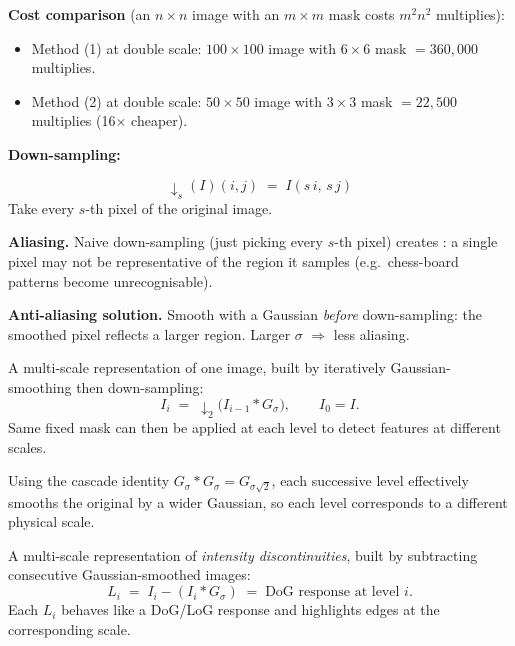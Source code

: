 \textbf{Cost comparison} (an $n \times n$ image with an $m \times m$ mask costs $m^2 n^2$ multiplies):
\begin{itemize}
  \item Method (1) at double scale: $100\times 100$ image with $6\times 6$ mask $= 360{,}000$ multiplies.
  \item Method (2) at double scale: $50\times 50$ image with $3\times 3$ mask $= 22{,}500$ multiplies (16$\times$ cheaper).
\end{itemize}

\separator

\textbf{Down-sampling:}

\begin{defbox}
\[
{\downarrow}_s(I)(i,j) \;=\; I(s\, i,\, s\, j)
\]
Take every $s$-th pixel of the original image.
\end{defbox}

\textbf{Aliasing.} Naive down-sampling (just picking every $s$-th pixel) creates : a single pixel may not be representative of the region it samples (e.g.\ chess-board patterns become unrecognisable).

\textbf{Anti-aliasing solution.} Smooth with a Gaussian \emph{before} down-sampling: the smoothed pixel reflects a larger region. Larger $\sigma$ $\Rightarrow$ less aliasing.

\separator

\begin{defbox}
A multi-scale representation of one image, built by iteratively Gaussian-smoothing then down-sampling:
\[
I_i \;=\; {\downarrow}_2 \bigl( I_{i-1} \ast G_\sigma \bigr), \qquad I_0 = I.
\]
Same fixed mask can then be applied at each level to detect features at different scales.
\end{defbox}

Using the cascade identity $G_\sigma \ast G_\sigma = G_{\sigma\sqrt{2}}$, each successive level effectively smooths the original by a wider Gaussian, so each level corresponds to a different physical scale.

\begin{defbox}
A multi-scale representation of \emph{intensity discontinuities}, built by subtracting consecutive Gaussian-smoothed images:
\[
L_i \;=\; I_i - (I_i \ast G_\sigma) \;=\; \text{DoG response at level } i.
\]
Each $L_i$ behaves like a DoG/LoG response and highlights edges at the corresponding scale.
\end{defbox}

